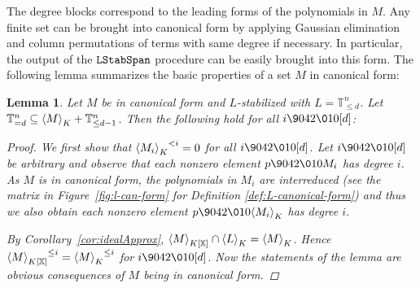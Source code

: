 \documentclass[11pt,oneside,english]{amsart}
\makeatletter
\numberwithin{equation}{section}
\numberwithin{figure}{section}
\theoremstyle{plain}
\theoremstyle{definition}
\theoremstyle{definition}
\theoremstyle{remark}
\theoremstyle{plain}
\newtheorem{lem}[thm]{Lemma}
\theoremstyle{plain}
\theoremstyle{plain}
\theoremstyle{problem@}
\makeatother
\begin{document}
The degree blocks correspond to the leading forms of the polynomials
in $M$. Any finite set can be brought into canonical
form by applying Gaussian elimination and column permutations of terms
with same degree if necessary. In particular, the output of the ${\ensuremath{\operatorname{{\textnormal{\texttt{{LStabSpan}}}}}}}$
procedure can be easily brought into this form.  The following lemma
summarizes the basic properties of a set $M$ in canonical form:
\begin{lem}
\label{lem:stableIdeal}
Let $M$ be in canonical form and $L$-stabilized with $L={\mathbb{T}}_{\leq d}^{n}$.
Let \({\mathbb{T}}^{n}_{=d} \subseteq {{\left\langle {M}\right\rangle}\sb{K}} + {\mathbb{T}}^{n}_{\leq d-1}\).
Then the following hold for all $i{\9042\010}[d]$:
\begin{proof}
We first show that ${{\left\langle {M_{i}}\right\rangle}\sb{K}}^{<i}=0$ for all $i{\9042\010}[d]$. Let
$i{\9042\010}[d]$ be arbitrary and observe that each nonzero element $p{\9042\010} M_{i}$
has degree $i$. As $M$ is in canonical form, the polynomials
in $M_{i}$ are interreduced (see the matrix in
Figure~\ref{fig:l-can-form} for Definition \ref{def:L-canonical-form})
and thus we also obtain each nonzero element $p{\9042\010}{{\left\langle {M_{i}}\right\rangle}\sb{K}}$ has
degree $i$.

By Corollary~\ref{cor:idealApprox}, \({{\left\langle {M}\right\rangle}\sb{K[\mathbb{X}]}} \cap {{\left\langle {L}\right\rangle}\sb{K}} = {{\left\langle {M}\right\rangle}\sb{K}}\).
Hence \({{\left\langle {M}\right\rangle}\sb{K[\mathbb{X}]}}^{\leq i} = {{\left\langle {M}\right\rangle}\sb{K}}^{\leq i}\) for \(i {\9042\010} [d]\).
Now the statements of the lemma are obvious consequences of \(M\)
being in canonical form.
\end{proof}
\end{lem}
\end{document}
